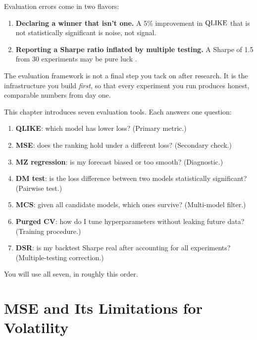 \begin{warning}
Evaluation errors come in two flavors:
\begin{enumerate}[nosep]
  \item \textbf{Declaring a winner that isn't one.} A 5\% improvement in $\operatorname{QLIKE}$ that is not statistically significant is noise, not signal.
  \item \textbf{Reporting a Sharpe ratio inflated by multiple testing.} A Sharpe of 1.5 from 30 experiments may be pure luck \citep{Bailey2014DSR}.
\end{enumerate}
\end{warning}

The evaluation framework is not a final step you tack on after research.
It is the infrastructure you build \emph{first}, so that every experiment you run produces honest, comparable numbers from day one.

\begin{keyidea}
This chapter introduces seven evaluation tools.
Each answers one question:
\begin{enumerate}[nosep]
  \item \textbf{QLIKE}: which model has lower loss? (Primary metric.)
  \item \textbf{MSE}: does the ranking hold under a different loss? (Secondary check.)
  \item \textbf{MZ regression}: is my forecast biased or too smooth? (Diagnostic.)
  \item \textbf{DM test}: is the loss difference between two models statistically significant? (Pairwise test.)
  \item \textbf{MCS}: given all candidate models, which ones survive? (Multi-model filter.)
  \item \textbf{Purged CV}: how do I tune hyperparameters without leaking future data? (Training procedure.)
  \item \textbf{DSR}: is my backtest Sharpe real after accounting for all experiments? (Multiple-testing correction.)
\end{enumerate}
You will use all seven, in roughly this order.
\end{keyidea}

\section{MSE and Its Limitations for Volatility}
\label{sec:eval-mse}

